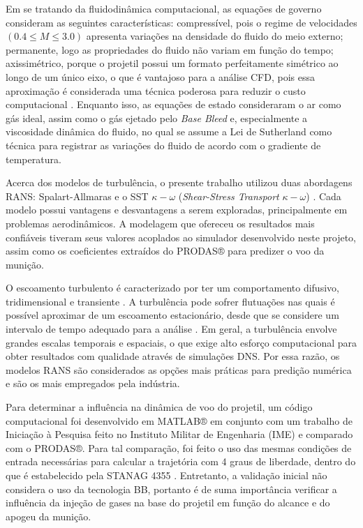 Em se tratando da fluidodinâmica computacional, as equações de governo consideram as seguintes características: compressível, pois o regime de velocidades \(\left(\num{0,4} \leq M \leq \num{3,0}\right)\) apresenta variações na densidade do fluido do meio externo; permanente, logo as propriedades do fluido não variam em função do tempo; axissimétrico, porque o projetil possui um formato perfeitamente simétrico ao longo de um único eixo, o que é vantajoso para a análise CFD, pois essa aproximação é considerada uma técnica poderosa para reduzir o custo computacional \cite{Lucena2020}. Enquanto isso, as equações de estado consideraram o ar como gás ideal, assim como o gás ejetado pelo \textit{Base Bleed} e, especialmente a viscosidade dinâmica do fluido, no qual se assume a Lei de Sutherland como técnica para registrar as variações do fluido de acordo com o gradiente de temperatura.

Acerca dos modelos de turbulência, o presente trabalho utilizou duas abordagens RANS: Spalart-Allmaras \cite{Spalart1992} e o SST \(\kappa-\omega\) (\textit{Shear-Stress Transport} \(\kappa-\omega\)) \cite{Menter1994TwoequationET,Menter2003,Menter2009}. Cada modelo possui vantagens e desvantagens a serem exploradas, principalmente em problemas aerodinâmicos. A modelagem que ofereceu os resultados mais confiáveis tiveram seus valores acoplados ao simulador desenvolvido neste projeto, assim como os coeficientes extraídos do PRODAS® para predizer o voo da munição.

O escoamento turbulento é caracterizado por ter um comportamento difusivo, tridimensional e transiente \cite{Rezende2009}. A turbulência pode sofrer flutuações nas quais é possível aproximar de um escoamento estacionário, desde que se considere um intervalo de tempo adequado para a análise \cite{Souza2011,SilveiraNeto2002}. Em geral, a turbulência envolve grandes escalas temporais e espaciais, o que exige alto esforço computacional para obter resultados com qualidade através de simulações DNS. Por essa razão, os modelos RANS são considerados as opções mais práticas para predição numérica e são os mais empregados pela indústria.
	
Para determinar a influência na dinâmica de voo do projetil, um código computacional foi desenvolvido em MATLAB® em conjunto com um trabalho de Iniciação à Pesquisa feito no Instituto Militar de Engenharia (IME) \cite{ThallyoENCIT2022,Thallyo2022} e comparado com o PRODAS®. Para tal comparação, foi feito o uso das mesmas condições de entrada necessárias para calcular a trajetória com 4 graus de liberdade, dentro do que é estabelecido pela STANAG 4355 \cite{stanag4355}. Entretanto, a validação inicial não considera o uso da tecnologia BB, portanto é de suma importância verificar a influência da injeção de gases na base do projetil em função do alcance e do apogeu da munição. 

